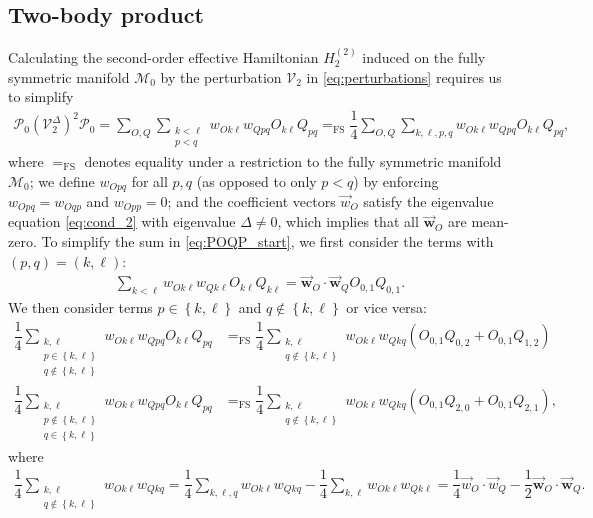 \documentclass[nofootinbib,notitlepage,11pt]{revtex4-2}
\newcommand{\f}[2]{\dfrac{#1}{#2}} %
\newcommand{\p}[1]{\left(#1\right)} %
\renewcommand{\set}[1]{\left\{#1\right\}} %
\renewcommand{\c}{\cdot} %
\newcommand{\m}{\bm} %
\renewcommand{\v}{\vec} %
\newcommand{\1}{\mathds{1}}
\newcommand{\M}{\mathcal{M}}
\renewcommand{\P}{\mathcal{P}}
\newcommand{\V}{\mathcal{V}}
\newcommand{\EQFS}{=_{\text{FS}}}
\begin{document}
\subsection{Two-body product}
\label{sec:POQP}

Calculating the second-order effective Hamiltonian $H_2^{(2)}$ induced
on the fully symmetric manifold $\M_0$ by the perturbation $\V_2$ in
\eqref{eq:perturbations} requires us to simplify
\begin{align}
  \P_0 \p{\V_2^\Delta}^2 \P_0
  = \sum_{O,Q} \sum_{\substack{k<\ell\\p<q}}
  w_{Ok\ell} w_{Qpq} O_{k\ell} Q_{pq}
  \EQFS \f14 \sum_{O,Q} \sum_{k,\ell,p,q}
  w_{Ok\ell} w_{Qpq} O_{k\ell} Q_{pq},
  \label{eq:POQP_start}
\end{align}
where $\EQFS$ denotes equality under a restriction to the fully
symmetric manifold $\M_0$; we define $w_{Opq}$ for all $p,q$ (as
opposed to only $p<q$) by enforcing $w_{Opq}=w_{Oqp}$ and $w_{Opp}=0$;
and the coefficient vectors $\v w_O$ satisfy the eigenvalue equation
\eqref{eq:cond_2} with eigenvalue $\Delta\ne0$, which implies that all
$\v{\m w}_O$ are mean-zero.  To simplify the sum in
\eqref{eq:POQP_start}, we first consider the terms with
$\p{p,q}=\p{k,\ell}$:
\begin{align}
  \sum_{k<\ell}
  w_{Ok\ell} w_{Qk\ell} O_{k\ell} Q_{k\ell}
  = \v{\m w}_O \c \v{\m w}_Q O_{0,1} Q_{0,1}.
\end{align}
We then consider terms $p\in\set{k,\ell}$ and $q\notin\set{k,\ell}$ or
vice versa:
\begin{align}
  \f14 \sum_{\substack{k,\ell\\p\in\set{k,\ell}\\q\notin\set{k,\ell}}}
  w_{Ok\ell} w_{Qpq} O_{k\ell} Q_{pq}
  &\EQFS \f14 \sum_{\substack{k,\ell\\q\notin\set{k,\ell}}}
  w_{Ok\ell} w_{Qkq} \p{O_{0,1} Q_{0,2} + O_{0,1} Q_{1,2}} \\
  \f14 \sum_{\substack{k,\ell\\p\notin\set{k,\ell}\\q\in\set{k,\ell}}}
  w_{Ok\ell} w_{Qpq} O_{k\ell} Q_{pq}
  &\EQFS \f14 \sum_{\substack{k,\ell\\q\notin\set{k,\ell}}}
  w_{Ok\ell} w_{Qkq} \p{O_{0,1} Q_{2,0} + O_{0,1} Q_{2,1}},
\end{align}
where
\begin{align}
  \f14 \sum_{\substack{k,\ell\\q\notin\set{k,\ell}}} w_{Ok\ell} w_{Qkq}
  = \f14 \sum_{k,\ell,q} w_{Ok\ell} w_{Qkq}
  - \f14 \sum_{k,\ell} w_{Ok\ell} w_{Qk\ell}
  = \f14 \v w_O\c\v w_Q - \f12 \v{\m w}_O \c \v{\m w}_Q.
\end{align}
\end{document}
